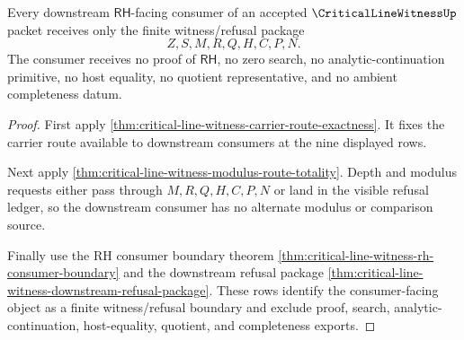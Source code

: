 \begin{theorem}
\label{thm:critical-line-witness-downstream-rh-boundary-nonescape}
Every downstream $\mathsf{RH}$-facing consumer of an accepted $\CriticalLineWitnessUp$ packet receives only the finite witness/refusal package
$$
Z,S,M,R,Q,H,C,P,N.
$$
The consumer receives no proof of $\mathsf{RH}$, no zero search, no analytic-continuation primitive, no host equality, no quotient representative, and no ambient completeness datum.
\end{theorem}
\begin{proof}
First apply \autoref{thm:critical-line-witness-carrier-route-exactness}. It fixes the carrier route available to downstream consumers at the nine displayed rows.

Next apply \autoref{thm:critical-line-witness-modulus-route-totality}. Depth and modulus requests either pass through $M,R,Q,H,C,P,N$ or land in the visible refusal ledger, so the downstream consumer has no alternate modulus or comparison source.

Finally use the RH consumer boundary theorem \autoref{thm:critical-line-witness-rh-consumer-boundary} and the downstream refusal package \autoref{thm:critical-line-witness-downstream-refusal-package}. These rows identify the consumer-facing object as a finite witness/refusal boundary and exclude proof, search, analytic-continuation, host-equality, quotient, and completeness exports.
\end{proof}
